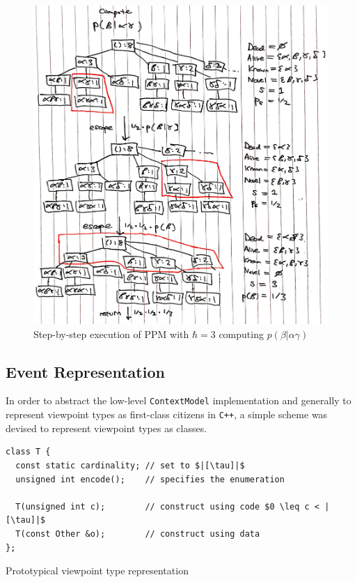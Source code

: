 \documentclass[12pt,a4paper,twoside,openright]{report}
\begin{document}
\begin{figure}[H]
\centering
\includegraphics[width=400pt]{figs/ppm_stepwise_tmp.jpg}
\caption{Step-by-step execution of PPM with $\hbar = 3$ computing $p(\beta|\alpha\gamma)$}
\label{fig:ppm-stepwise}
\end{figure}

\subsection{Event Representation}\label{sec:cpp-event-rep}

In order to abstract the low-level \texttt{ContextModel} implementation and
generally to represent viewpoint types as first-class citizens in \texttt{C++},
a simple scheme was devised to represent viewpoint types as classes.

\begin{listing}[H]
  \begin{verbatim}
class T {
  const static cardinality; // set to $|[\tau]|$
  unsigned int encode();    // specifies the enumeration

  T(unsigned int c);        // construct using code $0 \leq c < |[\tau]|$
  T(const Other &o);        // construct using data 
};
  \end{verbatim}
  \caption{Prototypical viewpoint type representation}
  \label{lst:event-rep}
\end{listing}
\end{document}
